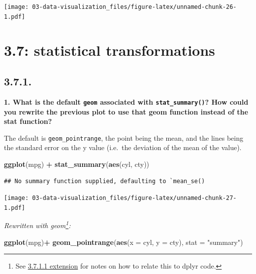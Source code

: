 \documentclass[]{book}
\newenvironment{Shaded}{\begin{snugshade}}{\end{snugshade}}
\newcommand{\DataTypeTok}[1]{\textcolor[rgb]{0.13,0.29,0.53}{#1}}
\newcommand{\KeywordTok}[1]{\textcolor[rgb]{0.13,0.29,0.53}{\textbf{#1}}}
\newcommand{\NormalTok}[1]{#1}
\newcommand{\OperatorTok}[1]{\textcolor[rgb]{0.81,0.36,0.00}{\textbf{#1}}}
\newcommand{\StringTok}[1]{\textcolor[rgb]{0.31,0.60,0.02}{#1}}
\let\rmarkdownfootnote\footnote%
\def\footnote{\protect\rmarkdownfootnote}
\theoremstyle{definition}
\theoremstyle{definition}
\theoremstyle{definition}
\theoremstyle{remark}
\begin{document}
\texttt{[image: 03-data-visualization\_files/figure-latex/unnamed-chunk-26-1.pdf]}

\hypertarget{statistical-transformations}{%
\section{3.7: statistical
transformations}\label{statistical-transformations}}

\hypertarget{section-4}{%
\subsection{3.7.1.}\label{section-4}}

\textbf{1. What is the default \texttt{geom} associated with
\texttt{stat\_summary()}? How could you rewrite the previous plot to use
that geom function instead of the stat function?}

The default is \texttt{geom\_pointrange}, the point being the mean, and
the lines being the standard error on the y value (i.e.~the deviation of
the mean of the value).

\begin{Shaded}
\begin{Highlighting}[]
\KeywordTok{ggplot}\NormalTok{(mpg) }\OperatorTok{+}
\StringTok{  }\KeywordTok{stat_summary}\NormalTok{(}\KeywordTok{aes}\NormalTok{(cyl, cty))}
\end{Highlighting}
\end{Shaded}

\begin{verbatim}
## No summary function supplied, defaulting to `mean_se()
\end{verbatim}

\texttt{[image: 03-data-visualization\_files/figure-latex/unnamed-chunk-27-1.pdf]}

\emph{Rewritten with geom\footnote{See
  \protect\hyperlink{extension}{3.7.1.1 extension} for notes on how to
  relate this to dplyr code.}:}

\begin{Shaded}
\begin{Highlighting}[]
\KeywordTok{ggplot}\NormalTok{(mpg)}\OperatorTok{+}
\StringTok{  }\KeywordTok{geom_pointrange}\NormalTok{(}\KeywordTok{aes}\NormalTok{(}\DataTypeTok{x =}\NormalTok{ cyl, }\DataTypeTok{y =}\NormalTok{ cty), }\DataTypeTok{stat =} \StringTok{"summary"}\NormalTok{)}
\end{Highlighting}
\end{Shaded}
\end{document}
